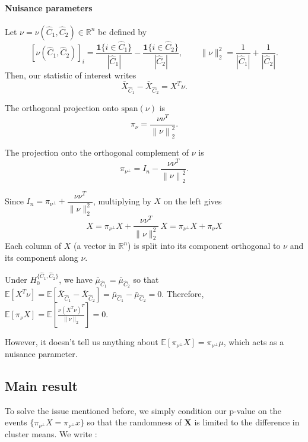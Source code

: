 \documentclass[11pt,a4paper]{article}
\newcommand{\norm}[1]{\lVert #1 \rVert_2}          %
\newcommand{\Hzero}{H_0^{\{\hat{C}_1,\hat{C}_2\}}} %
\begin{document}
\paragraph{Nuisance parameters} Let
$\nu = \nu(\hat C_1,\hat C_2)\in\mathbb{R}^n$ be defined by
\[
  [\nu(\hat C_1,\hat C_2)]_i
  = \frac{\mathbf{1}\{i\in\hat C_1\}}{|\hat C_1|}
  - \frac{\mathbf{1}\{i\in\hat C_2\}}{|\hat C_2|},
  \qquad
  \norm{\nu}^2 = \frac{1}{|\hat C_1|} + \frac{1}{|\hat C_2|}.
\]
Then, our statistic of interest writes
\begin{equation*}
  \bar X_{\hat C_1} - \bar X_{\hat C_2} = X^T\nu .
  \label{eq:diffmeans}
\end{equation*}

The orthogonal projection onto $\mathrm{span}(\nu)$ is
\begin{equation*}
  \pi_{\nu} = \frac{\nu\nu^T}{\left\|{\nu}\right\|_2^2}.
\end{equation*}

The projection onto the orthogonal complement of $\nu$ is
\begin{equation}
  \pi_{\nu^\perp} = I_n - \frac{\nu\nu^T}{{\left\|\nu\right\|}_2^2}.
\end{equation}

Since $I_n = \pi_{\nu^\perp} + \dfrac{\nu\nu^T}{\norm{\nu}^2}$, multiplying by $X$ on the left gives
\begin{equation}
  X = \pi_{\nu^\perp} X + \frac{\nu\nu^T}{\norm{\nu}^2}\,X = \pi_{\nu^\perp} X + \pi_{\nu} X
  \label{eq:decomp}
\end{equation}
Each column of $X$ (a vector in $\mathbb{R}^n$) is split into its component orthogonal to
$\nu$ and its component along $\nu$.

Under $\Hzero$, we have $\bar{\mu}_{\hat{C}_1} = \bar{\mu}_{\hat{C}_2}$ so that $\mathbb{E}[X^T\nu] = \mathbb{E}[\bar X_{\hat C_1} - \bar X_{\hat C_2}] = \bar{\mu}_{\hat{C}_1} - \bar{\mu}_{\hat{C}_2} = 0$. Therefore, $\mathbb{E}[\pi_{\nu}X] = \mathbb{E}\left[\frac{\nu (X^T\nu)^T}{\norm{\nu}}\right] = 0$. 

However, it doesn't tell us anything about $\mathbb{E}[\pi_{\nu^\perp}X] = \pi_{\nu^\perp}\mu$, which acts as a nuisance parameter.

\subsection{Main result}

To solve the issue mentioned before, we simply condition our p-value on the events $\{\pi_{\nu^\perp}X = \pi_{\nu^\perp}x\}$ so that the randomness of $\mathbf{X}$ is limited to the difference in cluster means. We write :
\end{document}
